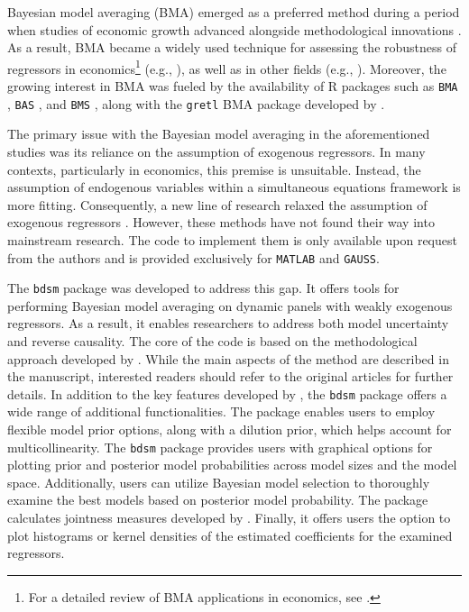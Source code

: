 \documentclass[a4paper]{article}
\begin{document}
Bayesian model averaging (BMA) emerged as a preferred method during a period when studies of economic growth advanced alongside methodological innovations \citep{Fernandez+2001,Fernandez+2001b,Sala+2004,Eicher+2007,Ley+2012,Moser+2014,Fernandez+2001,Fernandez+2001b,Arin+2019}. As a result, BMA became a widely used technique for assessing the robustness of regressors in economics\footnote{For a detailed review of BMA applications in economics, see \citet{Moral+2015,Steel+2020}.} (e.g., \citet{Liu+2009,Ductor+2016,Figini+2017,Beck+2022,DAndrea+2022,Horvath+2024}), as well as in other fields (e.g., \citet{Sloughter+2013,Baran+2015,Aller+2021,Guliyev+2024,Payne+2024}). Moreover, the growing interest in BMA was fueled by the availability of R packages such as \verb+BMA+ \citep{Raftery+2005}, \verb+BAS+ \citep{clyde2011bayesian}, and \verb+BMS+ \citep{Feldkircher+2015}, along with the \verb+gretl+ BMA package developed by \citet{Blazejowski+2015}.

The primary issue with the Bayesian model averaging in the aforementioned studies was its reliance on the assumption of exogenous regressors. In many contexts, particularly in economics, this premise is unsuitable. Instead, the assumption of endogenous variables within a simultaneous equations framework is more fitting. Consequently, a new line of research relaxed the assumption of exogenous regressors \citet{Lenkoski+2014,Leon+2015,Mirestean+2016,Moral+2016,Chen+2018}. However, these methods have not found their way into mainstream research. The code to implement them is only available upon request from the authors and is provided exclusively for \verb+MATLAB+ and \verb+GAUSS+.

The \verb+bdsm+ package was developed to address this gap. It offers tools for performing Bayesian model averaging on dynamic panels with weakly exogenous regressors. As a result, it enables researchers to address both model uncertainty and reverse causality. The core of the code is based on the methodological approach developed by \citet{Moral+2012,Moral+2013,Moral+2016}. While the main aspects of the method are described in the manuscript, interested readers should refer to the original articles for further details. In addition to the key features developed by \citet{Moral+2016}, the \verb+bdsm+ package offers a wide range of additional functionalities. The package enables users to employ flexible model prior options, along with a dilution prior, which helps account for multicollinearity. The \verb+bdsm+ package provides users with graphical options for plotting prior and posterior model probabilities across model sizes and the model space. Additionally, users can utilize Bayesian model selection to thoroughly examine the best models based on posterior model probability. The package calculates jointness measures developed by \citet{Doppelhofer+2009,Ley+2007,Hofmarcher+2018}. Finally, it offers users the option to plot histograms or kernel densities of the estimated coefficients for the examined regressors.
\end{document}
